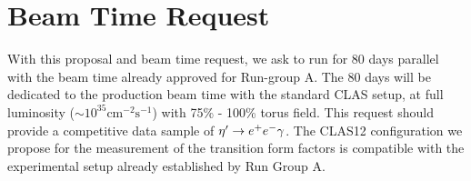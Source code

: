 \section{Beam Time Request}\label{sec:beamrequest}
With this proposal and beam time request, we ask to run for 80 days parallel with the beam time already approved for Run-group A. The 80 days will be dedicated to the production beam time with the standard CLAS setup, at full luminosity ($\sim 10^{35} \mathrm{cm^{-2}s^{-1}}$) with 75\% - 100\% torus field. This request should provide a competitive data sample of $\eta^{\prime} \to e^+e^- \gamma$. The CLAS12 configuration we propose for the measurement of the transition form factors is compatible with the experimental setup already established by Run Group A.